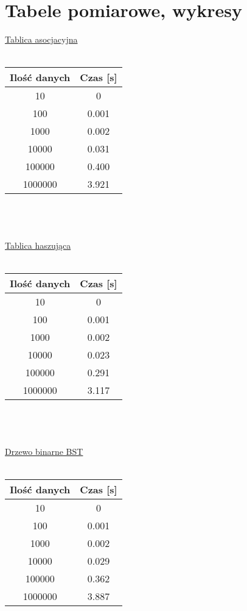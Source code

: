 \documentclass[11pt]{article}
\begin{document}
\section{Tabele pomiarowe, wykresy}
\underline{Tablica asocjacyjna} \\ \\
\begin{tabular}{|c|c|}
  \hline
  Ilość danych & Czas [s] \\
  \hline \hline
  10 & 0 \\ \hline
  100 & 0.001\\ \hline
  1000 & 0.002 \\ \hline
  10000 & 0.031 \\ \hline
  100000 & 0.400 \\ \hline
  1000000 & 3.921 \\ \hline
  
  \hline
  \end{tabular} 
\\ \\ \\
\underline{Tablica haszująca} \\ \\
\begin{tabular}{|c|c|} 
  \hline
  Ilość danych & Czas [s] \\
  \hline \hline
  10 & 0 \\ \hline
  100 & 0.001\\  \hline
  1000 & 0.002\\  \hline
  10000 & 0.023\\  \hline
  100000 & 0.291 \\ \hline
  1000000 & 3.117 \\ \hline
  \hline
  \end{tabular} 
 \\ \\ \\
\underline{Drzewo binarne BST} \\ \\
\begin{tabular}{|c|c|}
  \hline
  Ilość danych & Czas [s] \\
  \hline \hline
  10 & 0 \\ \hline
  100 & 0.001\\  \hline
  1000 & 0.002\\  \hline
  10000 & 0.029\\  \hline
  100000 & 0.362 \\ \hline
  1000000 & 3.887 \\ \hline
  \hline
  \end{tabular} 
\end{document}
